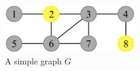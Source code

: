 {\begin{columns}
\begin{column}{0.5\textwidth}
\begin{center}
\begin{textblock*}{8cm}
          \begin{figure}
            \centering
            \includegraphics[width=5.7cm]{../figures/algorithm1-slide-3.pdf}
            \caption*{A simple graph $G$}
          \end{figure}
        \end{textblock*}
      \end{center}
    \end{column}
  \end{columns}
}

